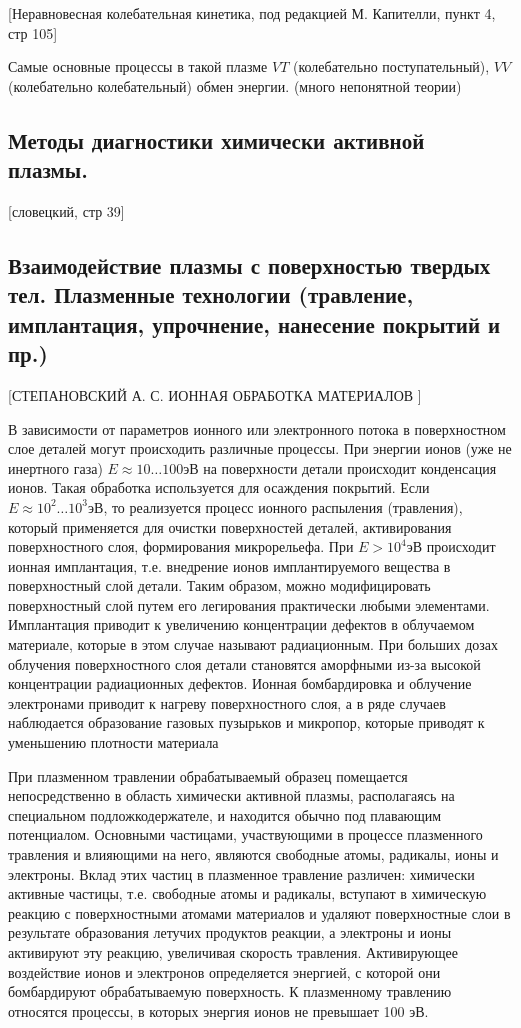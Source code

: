 \documentclass[10pt, a4paper]{article}
\numberwithin{equation}{section}
\begin{document}
[Неравновесная колебательная кинетика, под редакцией М. Капителли, пункт 4, стр 105]

Самые основные процессы в такой плазме $VT$ (колебательно поступательный), $VV$ (колебательно колебательный) обмен энергии. (много непонятной теории)

\subsection{Методы диагностики химически активной плазмы.}
\label{14.7} 


 [словецкий, стр 39]

\subsection{Взаимодействие плазмы с поверхностью твердых тел. Плазменные технологии (травление, имплантация, упрочнение, нанесение покрытий и пр.)}
\label{14.8}


 [СТЕПАНОВСКИЙ А. С. ИОННАЯ ОБРАБОТКА МАТЕРИАЛОВ ]


В зависимости от параметров ионного или электронного потока в поверхностном слое деталей могут происходить различные процессы. При энергии ионов (уже не инертного газа) $E \approx 10…100 эВ$ на поверхности детали происходит конденсация ионов. Такая обработка используется для осаждения покрытий. Если $E \approx 10^2…10^3 эВ$, то реализуется процесс ионного распыления (травления), который применяется для очистки поверхностей деталей, активирования поверхностного слоя, формирования микрорельефа. При $E > 10^4 эВ$ происходит ионная имплантация, т.е. внедрение ионов имплантируемого вещества в поверхностный слой детали. Таким образом, можно модифицировать поверхностный слой путем его легирования практически любыми элементами. Имплантация приводит к увеличению концентрации дефектов в облучаемом материале, которые в этом случае называют радиационным. При больших дозах облучения поверхностного слоя детали становятся аморфными из-за высокой концентрации радиационных дефектов. Ионная бомбардировка и облучение электронами приводит к нагреву поверхностного слоя, а в ряде случаев наблюдается образование газовых пузырьков и микропор, которые приводят к уменьшению плотности материала


При плазменном травлении обрабатываемый образец помещается непосредственно в область химически активной плазмы, располагаясь на специальном подложкодержателе, и
находится обычно под плавающим потенциалом. Основными частицами, участвующими в процессе плазменного травления и влияющими на него, являются свободные атомы, радикалы, ионы и электроны. Вклад этих частиц в плазменное травление различен: химически активные частицы, т.е. свободные атомы и радикалы, вступают в химическую реакцию с поверхностными атомами материалов и удаляют поверхностные слои в
результате образования летучих продуктов реакции, а электроны и ионы активируют эту реакцию, увеличивая скорость травления. Активирующее воздействие ионов и электронов
определяется энергией, с которой они бомбардируют обрабатываемую поверхность. К плазменному травлению относятся процессы, в которых энергия ионов не превышает 100 эВ.
\end{document}
